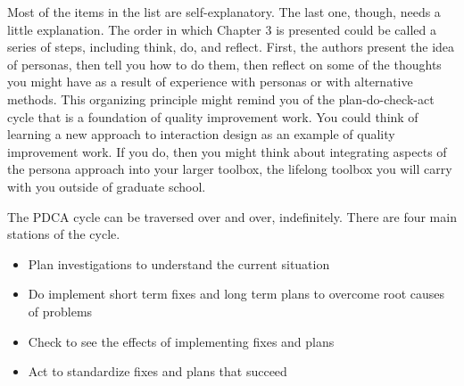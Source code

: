 Most of the items in the list are self-explanatory. The last one,
though, needs a little explanation. The order in which Chapter 3 is
presented could be called a series of steps, including think, do, and
reflect. First, the authors present the idea of personas, then tell you
how to do them, then reflect on some of the thoughts you might have as a
result of experience with personas or with alternative methods. This
organizing principle might remind you of the plan-do-check-act cycle
that is a foundation of quality improvement work. You could think of
learning a new approach to interaction design as an example of quality
improvement work. If you do, then you might think about integrating
aspects of the persona approach into your larger toolbox, the lifelong
toolbox you will carry with you outside of graduate school.

\begin{center}
\end{center}

The PDCA cycle can be traversed over and over, indefinitely. There are
four main stations of the cycle.

\begin{itemize}
\tightlist
\item
  Plan investigations to understand the current situation
\item
  Do implement short term fixes and long term plans to overcome root
  causes of problems
\item
  Check to see the effects of implementing fixes and plans
\item
  Act to standardize fixes and plans that succeed
\end{itemize}

